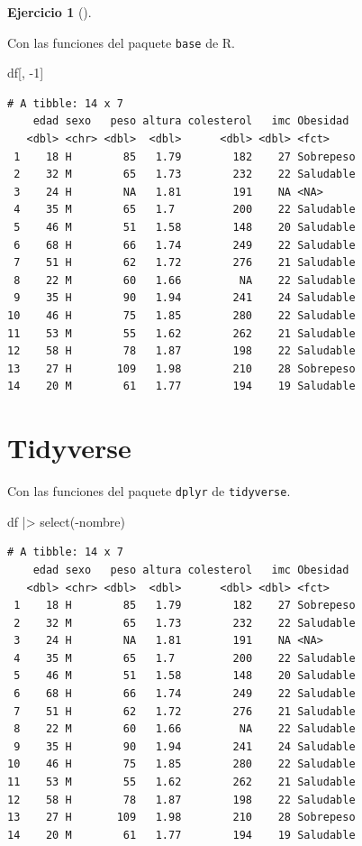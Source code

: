 \documentclass[
  a4paper,
]{scrreport}
\newenvironment{Shaded}{\begin{snugshade}}{\end{snugshade}}
\newcommand{\DecValTok}[1]{\textcolor[rgb]{0.68,0.00,0.00}{#1}}
\newcommand{\FunctionTok}[1]{\textcolor[rgb]{0.28,0.35,0.67}{#1}}
\newcommand{\NormalTok}[1]{\textcolor[rgb]{0.00,0.23,0.31}{#1}}
\newcommand{\SpecialCharTok}[1]{\textcolor[rgb]{0.37,0.37,0.37}{#1}}
\theoremstyle{definition}
\newtheorem{exercise}{Ejercicio}[chapter]
\theoremstyle{remark}
\begin{document}
\begin{exercise}[]
\begin{enumerate}
\begin{tcolorbox}
  Con las funciones del paquete \texttt{base} de R.

\begin{Shaded}
\begin{Highlighting}[]
\NormalTok{df[, }\SpecialCharTok{{-}}\DecValTok{1}\NormalTok{]}
\end{Highlighting}
\end{Shaded}

\begin{verbatim}
# A tibble: 14 x 7
    edad sexo   peso altura colesterol   imc Obesidad 
   <dbl> <chr> <dbl>  <dbl>      <dbl> <dbl> <fct>    
 1    18 H        85   1.79        182    27 Sobrepeso
 2    32 M        65   1.73        232    22 Saludable
 3    24 H        NA   1.81        191    NA <NA>     
 4    35 M        65   1.7         200    22 Saludable
 5    46 M        51   1.58        148    20 Saludable
 6    68 H        66   1.74        249    22 Saludable
 7    51 H        62   1.72        276    21 Saludable
 8    22 M        60   1.66         NA    22 Saludable
 9    35 H        90   1.94        241    24 Saludable
10    46 H        75   1.85        280    22 Saludable
11    53 M        55   1.62        262    21 Saludable
12    58 H        78   1.87        198    22 Saludable
13    27 H       109   1.98        210    28 Sobrepeso
14    20 M        61   1.77        194    19 Saludable
\end{verbatim}

  \section{Tidyverse}

  Con las funciones del paquete \texttt{dplyr} de \texttt{tidyverse}.

\begin{Shaded}
\begin{Highlighting}[]
\NormalTok{df }\SpecialCharTok{|\textgreater{}} \FunctionTok{select}\NormalTok{(}\SpecialCharTok{{-}}\NormalTok{nombre)}
\end{Highlighting}
\end{Shaded}

\begin{verbatim}
# A tibble: 14 x 7
    edad sexo   peso altura colesterol   imc Obesidad 
   <dbl> <chr> <dbl>  <dbl>      <dbl> <dbl> <fct>    
 1    18 H        85   1.79        182    27 Sobrepeso
 2    32 M        65   1.73        232    22 Saludable
 3    24 H        NA   1.81        191    NA <NA>     
 4    35 M        65   1.7         200    22 Saludable
 5    46 M        51   1.58        148    20 Saludable
 6    68 H        66   1.74        249    22 Saludable
 7    51 H        62   1.72        276    21 Saludable
 8    22 M        60   1.66         NA    22 Saludable
 9    35 H        90   1.94        241    24 Saludable
10    46 H        75   1.85        280    22 Saludable
11    53 M        55   1.62        262    21 Saludable
12    58 H        78   1.87        198    22 Saludable
13    27 H       109   1.98        210    28 Sobrepeso
14    20 M        61   1.77        194    19 Saludable
\end{verbatim}


\end{tcolorbox}
\end{enumerate}
\end{exercise}
\end{document}
